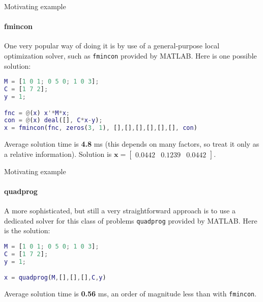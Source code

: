 \documentclass{beamer}
\begin{document}
\begin{frame}[fragile]{Motivating example}
\framesubtitle{fmincon}
\begin{flushleft}

One very popular way of doing it is by use of a general-purpose local optimization solver, such as \texttt{fmincon} provided by MATLAB. Here is one possible solution:

\begin{lstlisting}[language=Matlab]
M = [1 0 1; 0 5 0; 1 0 3]; 
C = [1 7 2]; 
y = 1;

fnc = @(x) x'*M*x;
con = @(x) deal([], C*x-y);
x = fmincon(fnc, zeros(3, 1), [],[],[],[],[],[], con)
\end{lstlisting}

Average solution time is \textbf{4.8} ms (this depends on many factors, so treat it only as a relative information). 
Solution is $\mathbf{x} = \begin{bmatrix} 0.0442 & 0.1239 & 0.0442 \end{bmatrix}$.

\end{flushleft}
\end{frame}


\begin{frame}[fragile]{Motivating example}
\framesubtitle{quadprog}
\begin{flushleft}

A more sophisticated, but still a very straightforward approach is to use a dedicated solver for this class of problems \texttt{quadprog} provided by MATLAB. Here is the solution:

\begin{lstlisting}[language=Matlab]
M = [1 0 1; 0 5 0; 1 0 3]; 
C = [1 7 2]; 
y = 1;

x = quadprog(M,[],[],[],C,y)
\end{lstlisting}

Average solution time is \textbf{0.56} ms, an order of magnitude less than with \texttt{fmincon}.

\end{flushleft}
\end{frame}
\end{document}
